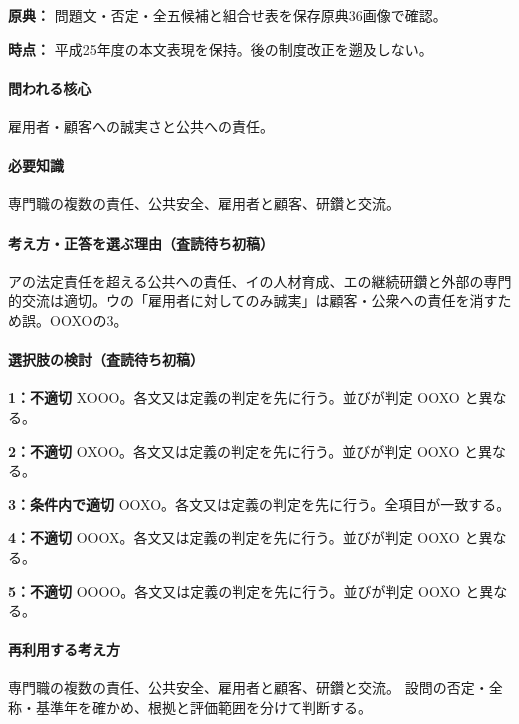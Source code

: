 \noindent\textbf{原典：} 問題文・否定・全五候補と組合せ表を保存原典36画像で確認。\par

\noindent\textbf{時点：} 平成25年度の本文表現を保持。後の制度改正を遡及しない。\par

\paragraph{問われる核心} 雇用者・顧客への誠実さと公共への責任。

\paragraph{必要知識} 専門職の複数の責任、公共安全、雇用者と顧客、研鑽と交流。

\paragraph{考え方・正答を選ぶ理由（査読待ち初稿）} アの法定責任を超える公共への責任、イの人材育成、エの継続研鑽と外部の専門的交流は適切。ウの「雇用者に対してのみ誠実」は顧客・公衆への責任を消すため誤。OOXOの3。

\paragraph{選択肢の検討（査読待ち初稿）}\mbox{}\par

\noindent\textbf{1：不適切} XOOO。各文又は定義の判定を先に行う。並びが判定 OOXO と異なる。\par

\noindent\textbf{2：不適切} OXOO。各文又は定義の判定を先に行う。並びが判定 OOXO と異なる。\par

\noindent\textbf{3：条件内で適切} OOXO。各文又は定義の判定を先に行う。全項目が一致する。\par

\noindent\textbf{4：不適切} OOOX。各文又は定義の判定を先に行う。並びが判定 OOXO と異なる。\par

\noindent\textbf{5：不適切} OOOO。各文又は定義の判定を先に行う。並びが判定 OOXO と異なる。\par

\paragraph{再利用する考え方} 専門職の複数の責任、公共安全、雇用者と顧客、研鑽と交流。 設問の否定・全称・基準年を確かめ、根拠と評価範囲を分けて判断する。

